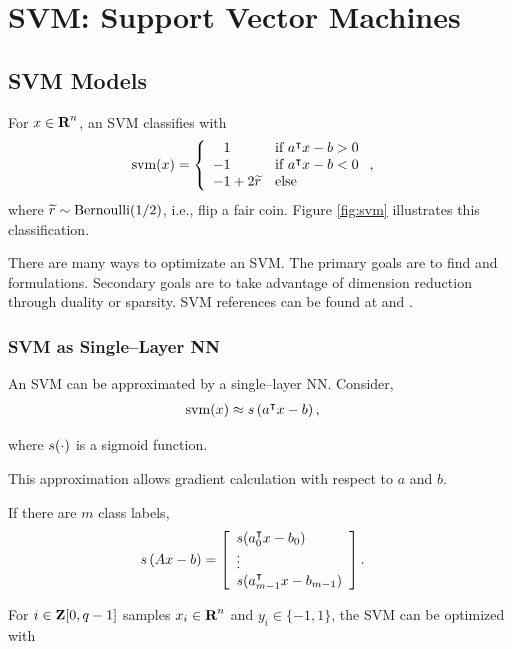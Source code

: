 \documentclass{article}
\begin{document}
    \clearpage

\section{SVM: Support Vector Machines}

    \subsection{SVM Models}

    For $x\in\textbf{R}^n$, an SVM classifies with
    \begin{align}
        \svm (x) &= \left\{
            \arr{ 
                \minus1 & \text{if $a^\tp x - b > 0$} \\ 
                -1 & \text{if $a^\tp x - b < 0$} \\                
                -1+2\rand{r} & \text{else} }
            \right.,
    \end{align}
    where $\widetilde{r}\sim\text{Bernoulli}(1/2)$, i.e., flip a fair coin.
    Figure \ref{fig:svm} illustrates this classification. 

    There are many ways to optimizate an SVM.  
    The primary goals are to find \LP and \QP formulations.
    Secondary goals are to take advantage of dimension reduction through duality or sparsity.
    SVM references can be found at \cite{svm1} and \cite{svm2}.
    
    \subsubsection{SVM as Single--Layer NN}
    An SVM can be approximated by a single--layer NN.  Consider,
    \begin{align*}
        \text{svm} (x)&\approx s\left(a^\intercal x - b\right),
    \end{align*}

    where $s(\cdot)$ is a sigmoid function.

    This approximation allows gradient calculation 
    with respect to $a$ and $b$.

    If there are $m$ class labels,
    \begin{align*}
        s\left(A x - b\right)&= \left[\begin{array}{lllllllllllllllllll}s(a_0^\intercal x-b_0) \\ 
        \vdots \\ s(a_{m-1}^\intercal x-b_{m-1}) \end{array}\right].
    \end{align*}

    For $i\in\textbf{Z}[0,q-1]$ samples $x_i\in\textbf{R}^n$ and $y_i\in\{-1,1\}$,
    the SVM can be optimized with
\end{document}
